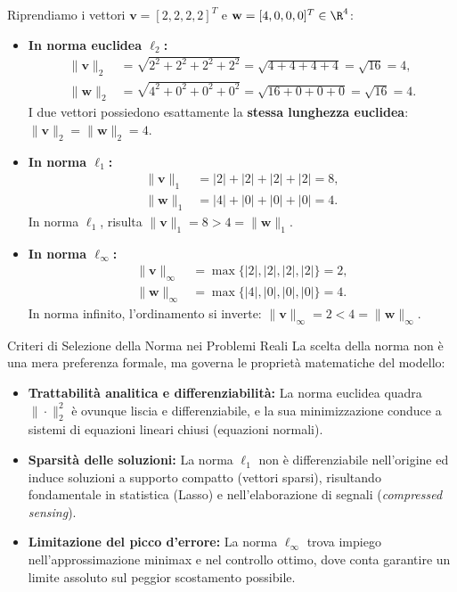 Riprendiamo i vettori $\mathbf{v} = [2, 2, 2, 2]^T$ e $\mathbf{w} = [4, 0, 0, 0]^T \in \R^4$:

\begin{example}
\mbox{}\par\nopagebreak
\begin{itemize}
    \item \textbf{In norma euclidea $\ell_2$:}
    \begin{align}
        \|\mathbf{v}\|_2 &= \sqrt{2^2 + 2^2 + 2^2 + 2^2} = \sqrt{4 + 4 + 4 + 4} = \sqrt{16} = 4, \\
        \|\mathbf{w}\|_2 &= \sqrt{4^2 + 0^2 + 0^2 + 0^2} = \sqrt{16 + 0 + 0 + 0} = \sqrt{16} = 4.
    \end{align}
    I due vettori possiedono esattamente la \textbf{stessa lunghezza euclidea}: $\|\mathbf{v}\|_2 = \|\mathbf{w}\|_2 = 4$.
    \item \textbf{In norma $\ell_1$:}
    \begin{align}
        \|\mathbf{v}\|_1 &= |2| + |2| + |2| + |2| = 8, \\
        \|\mathbf{w}\|_1 &= |4| + |0| + |0| + |0| = 4.
    \end{align}
    In norma $\ell_1$, risulta $\|\mathbf{v}\|_1 = 8 > 4 = \|\mathbf{w}\|_1$.
    \item \textbf{In norma $\ell_\infty$:}
    \begin{align}
        \|\mathbf{v}\|_\infty &= \max\{|2|, |2|, |2|, |2|\} = 2, \\
        \|\mathbf{w}\|_\infty &= \max\{|4|, |0|, |0|, |0|\} = 4.
    \end{align}
    In norma infinito, l'ordinamento si inverte: $\|\mathbf{v}\|_\infty = 2 < 4 = \|\mathbf{w}\|_\infty$.
\end{itemize}
\end{example}

\begin{alertblock}{Criteri di Selezione della Norma nei Problemi Reali}
La scelta della norma non è una mera preferenza formale, ma governa le proprietà matematiche del modello:
\begin{itemize}
    \item \textbf{Trattabilità analitica e differenziabilità:} La norma euclidea quadra $\|\cdot\|_2^2$ è ovunque liscia e differenziabile, e la sua minimizzazione conduce a sistemi di equazioni lineari chiusi (equazioni normali).
    \item \textbf{Sparsità delle soluzioni:} La norma $\ell_1$ non è differenziabile nell'origine ed induce soluzioni a supporto compatto (vettori sparsi), risultando fondamentale in statistica (Lasso) e nell'elaborazione di segnali (\textit{compressed sensing}).
    \item \textbf{Limitazione del picco d'errore:} La norma $\ell_\infty$ trova impiego nell'approssimazione minimax e nel controllo ottimo, dove conta garantire un limite assoluto sul peggior scostamento possibile.
\end{itemize}
\end{alertblock}

